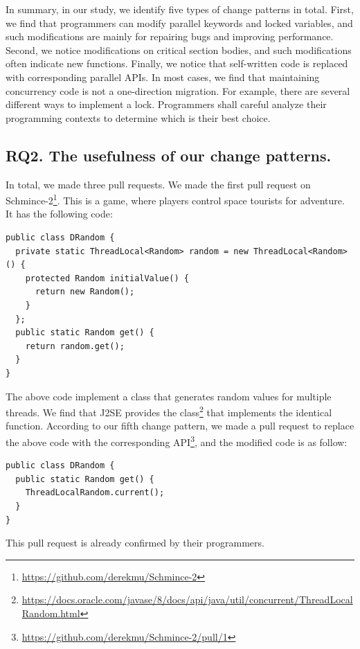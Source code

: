 In summary, in our study, we identify five types of change patterns in total. First, we find that programmers can modify parallel keywords and locked variables, and such modifications are mainly for repairing bugs and improving performance. Second, we notice modifications on critical section bodies, and such modifications often indicate new functions. Finally, we notice that self-written code is replaced with corresponding parallel APIs. In most cases, we find that maintaining concurrency code is not a one-direction migration. For example, there are several different ways to implement a lock. Programmers shall careful analyze their programming contexts to determine which is their best choice.

\subsection{RQ2. The usefulness of our change patterns.}
\label{sec:result:sample}


In total, we made three pull requests. We made the first pull request on Schmince-2\footnote{\url{https://github.com/derekmu/Schmince-2}}. This is a game, where players control space tourists for adventure. It has the following code:

\begin{lstlisting}
public class DRandom {
  private static ThreadLocal<Random> random = new ThreadLocal<Random>() {
    protected Random initialValue() {
      return new Random();
    }
  };
  public static Random get() {
    return random.get();
  }
}
\end{lstlisting}

The above code implement a class that generates random values for multiple threads. We find that J2SE provides the  class\footnote{\url{https://docs.oracle.com/javase/8/docs/api/java/util/concurrent/ThreadLocalRandom.html}} that implements the identical function. According to our fifth change pattern, we made a pull request to replace the above code with the corresponding API\footnote{\url{https://github.com/derekmu/Schmince-2/pull/1}}, and the modified code is as follow:

\begin{lstlisting}
public class DRandom {
  public static Random get() {
    ThreadLocalRandom.current();
  }
}
\end{lstlisting}
This pull request is already confirmed by their programmers.

